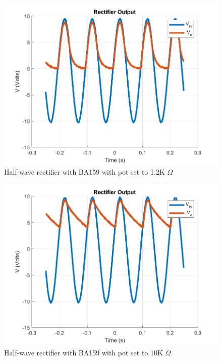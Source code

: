\documentclass[letterpaper,12pt]{article}
\begin{document}
\begin{figure}[H]
    \centering
    \includegraphics[width=1\textwidth]{2_b_POT_1_2K.png}
    \caption{Half-wave rectifier with BA159 with pot set to 1.2K \(\Omega\)}
\end{figure} 


\begin{figure}[H]
    \centering
    \includegraphics[width=1\textwidth]{2_b_POT_10K.png}
    \caption{Half-wave rectifier with BA159 with pot set to 10K \(\Omega\)}
\end{figure} 
\end{document}
